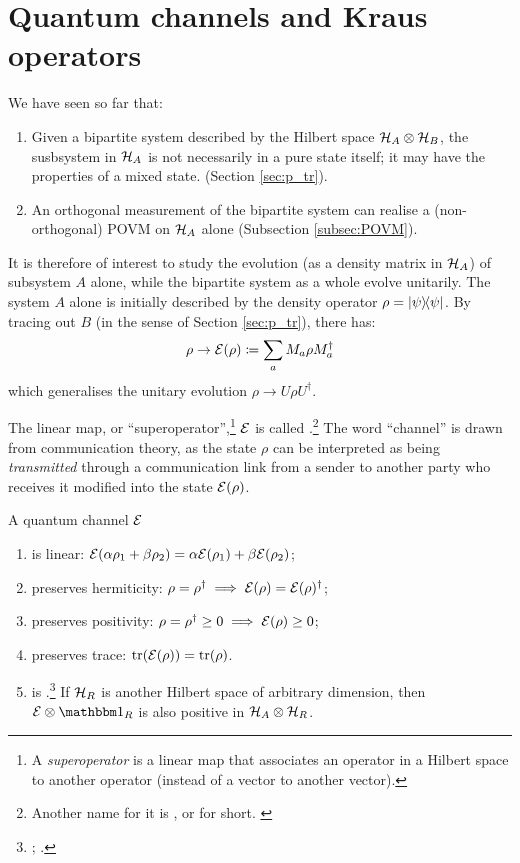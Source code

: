 \section{Quantum channels and Kraus operators}

We have seen so far that:
\begin{enumerate}
\item
  Given a bipartite system
  described by the Hilbert space
  $\mathcal{H}_A\otimes\mathcal{H}_B$,
  the susbsystem in $\mathcal{H}_A$
  is not necessarily in a pure state itself; it
  may have the properties of a mixed state.
  (Section \ref{sec:p_tr}).
\item
  An orthogonal measurement of the bipartite system can realise a
  (non-orthogonal) POVM on $\mathcal{H}_A$ alone (Subsection \ref{subsec:POVM}).
\end{enumerate}

It is therefore of interest to study
the evolution (as a density matrix in $\mathcal{H}_A$) of subsystem $A$ alone,
while the bipartite system as a whole evolve unitarily.
The system $A$ alone
is initially described by the density operator $\rho=\ketbra{\psi}$.
By tracing out
$B$
(in the sense of Section \ref{sec:p_tr}),
there has:
\begin{equation}\label{eq:channel}
  \rho \rightarrow \mathcal{E}(\rho) \coloneqq \sum_a M_a \rho M_a^{\dagger}
\end{equation}
which generalises the unitary evolution $\rho \rightarrow U \rho U^{\dagger}$.

The linear map, or ``superoperator'',\footnote{
  A \emph{superoperator} is a linear map that associates an operator
  in a Hilbert space to another operator (instead of a vector to another vector).
}
$\mathcal{E}$
is called .\footnote{
  Another name for it is
  ,
  or  for short. \parencite[sec.3.2]{PreskillNotes}
}
The word ``channel'' is drawn from communication theory,
as the state $\rho$ can be interpreted as being \emph{transmitted}
through
a communication link from a sender to another party
who receives it modified into the state $\mathcal{E}(\rho)$.

A quantum channel $\mathcal{E}$
\begin{enumerate}
  \item is linear:
    $\mathcal{E}(\alpha\rho_1+\beta\rho_2) = \alpha\mathcal{E}(\rho_1) + \beta\mathcal{E}(\rho_2)$;
  \item preserves hermiticity:
    $\rho = \rho^{\dagger} \implies \mathcal{E}(\rho) = \mathcal{E}(\rho)^{\dagger}$;
  \item preserves positivity:
    $\rho = \rho^{\dagger} \geq 0 \implies \mathcal{E}(\rho) \geq 0$;
  \item preserves trace:
    $\tr(\mathcal{E}(\rho)) = \tr(\rho)$.
  \item is .\footnote{\citereset
      \cite[sec. 3.2.6]{PreskillNotes}; \cite[sec. 8.2.4]{NielsenChuang}.
    } If $\mathcal{H}_R$
    is another Hilbert space of arbitrary dimension,
    then $\superop{E} \ox \idop_{R}$ is also positive
    in $\mathcal{H}_A \otimes \mathcal{H}_R$.
\end{enumerate}

